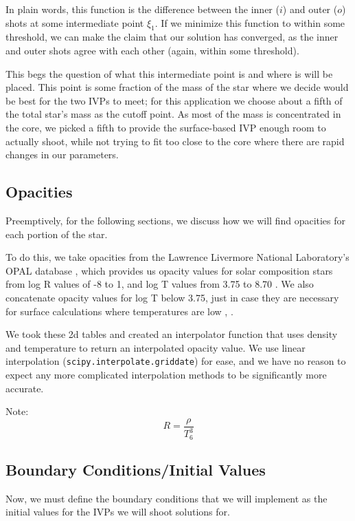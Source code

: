 \documentclass[twocolumn]{aastex631}
\begin{document}
In plain words, this function is the difference between the inner ($i$) and outer ($o$) shots at some intermediate point $\xi_1$. If we minimize this function to within some threshold, we can make the claim that our solution has converged, as the inner and outer shots agree with each other (again, within some threshold).

This begs the question of what this intermediate point is and where is will be placed. This point is some fraction of the mass of the star where we decide would be best for the two IVPs to meet; for this application we choose about a fifth of the total star's mass as the cutoff point. As most of the mass is concentrated in the core, we picked a fifth to provide the surface-based IVP enough room to actually shoot, while not trying to fit too close to the core where there are rapid changes in our parameters.


\subsection{Opacities}

Preemptively, for the following sections, we discuss how we will find opacities for each portion of the star. 

To do this, we take opacities from the Lawrence Livermore National Laboratory's OPAL database \citep{opal}, which provides us opacity values for solar composition stars from log R values of -8 to 1, and log T values from 3.75 to 8.70 \citep{opacities}. We also concatenate opacity values for log T below 3.75, just in case they are necessary for surface calculations where temperatures are low \citep{asplund}, \citep{lowt}.

We took these 2d tables and created an interpolator function that uses density and temperature to return an interpolated opacity value. We use linear interpolation (\texttt{scipy.interpolate.griddate}) for ease, and we have no reason to expect any more complicated interpolation methods to be significantly more accurate.

Note:
\begin{equation}
	R = \frac{\rho}{T_6^3}
\end{equation}

\subsection{Boundary Conditions/Initial Values}

Now, we must define the boundary conditions that we will implement as the initial values for the IVPs we will shoot solutions for.
\end{document}
